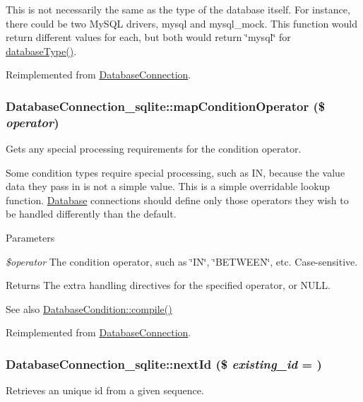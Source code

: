This is not necessarily the same as the type of the database itself. For instance, there could be two MySQL drivers, mysql and mysql\_\-mock. This function would return different values for each, but both would return \char`\"{}mysql\char`\"{} for \hyperlink{classDatabaseConnection__sqlite_acafbe944024f6bbdf26c11dab3c6b534}{databaseType()}. 

Reimplemented from \hyperlink{classDatabaseConnection_a4a36a8d7352108c837c51a7172f966c3}{DatabaseConnection}.\hypertarget{classDatabaseConnection__sqlite_aed69efc240fdb031430c8afbdb6c3ba9}{
\subsubsection[{mapConditionOperator}]{\setlength{\rightskip}{0pt plus 5cm}DatabaseConnection\_\-sqlite::mapConditionOperator (\$ {\em operator})}}
\label{classDatabaseConnection__sqlite_aed69efc240fdb031430c8afbdb6c3ba9}
Gets any special processing requirements for the condition operator.

Some condition types require special processing, such as IN, because the value data they pass in is not a simple value. This is a simple overridable lookup function. \hyperlink{classDatabase}{Database} connections should define only those operators they wish to be handled differently than the default.


\begin{DoxyParams}{Parameters}
\item[{\em \$operator}]The condition operator, such as \char`\"{}IN\char`\"{}, \char`\"{}BETWEEN\char`\"{}, etc. Case-\/sensitive.\end{DoxyParams}
\begin{DoxyReturn}{Returns}
The extra handling directives for the specified operator, or NULL.
\end{DoxyReturn}
\begin{DoxySeeAlso}{See also}
\hyperlink{classDatabaseCondition_a286df1af0dfaa7ab6b8b30ed4e96a830}{DatabaseCondition::compile()} 
\end{DoxySeeAlso}


Reimplemented from \hyperlink{classDatabaseConnection_aef82436b30fa08a6c81c34e11f3b1717}{DatabaseConnection}.\hypertarget{classDatabaseConnection__sqlite_ada0053b7801625663994ae1e0ddaabdf}{
\subsubsection[{nextId}]{\setlength{\rightskip}{0pt plus 5cm}DatabaseConnection\_\-sqlite::nextId (\$ {\em existing\_\-id} = {})}}
\label{classDatabaseConnection__sqlite_ada0053b7801625663994ae1e0ddaabdf}
Retrieves an unique id from a given sequence.

